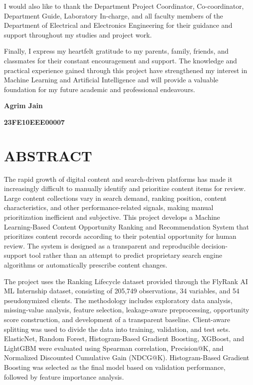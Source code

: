 \documentclass[12pt,a4paper]{report}
\begin{document}
I would also like to thank the Department Project Coordinator, Co-coordinator, Department Guide, Laboratory In-charge, and all faculty members of the Department of Electrical and Electronics Engineering for their guidance and support throughout my studies and project work.

Finally, I express my heartfelt gratitude to my parents, family, friends, and classmates for their constant encouragement and support. The knowledge and practical experience gained through this project have strengthened my interest in Machine Learning and Artificial Intelligence and will provide a valuable foundation for my future academic and professional endeavours.

\vspace{1cm}
\textbf{Agrim Jain}\par
\textbf{23FE10EEE00007}

\chapter*{ABSTRACT}
The rapid growth of digital content and search-driven platforms has made it increasingly difficult to manually identify and prioritize content items for review. Large content collections vary in search demand, ranking position, content characteristics, and other performance-related signals, making manual prioritization inefficient and subjective. This project develops a Machine Learning-Based Content Opportunity Ranking and Recommendation System that prioritizes content records according to their potential opportunity for human review. The system is designed as a transparent and reproducible decision-support tool rather than an attempt to predict proprietary search engine algorithms or automatically prescribe content changes.

The project uses the Ranking Lifecycle dataset provided through the FlyRank AI ML Internship dataset, consisting of 205,749 observations, 34 variables, and 54 pseudonymized clients. The methodology includes exploratory data analysis, missing-value analysis, feature selection, leakage-aware preprocessing, opportunity score construction, and development of a transparent baseline. Client-aware splitting was used to divide the data into training, validation, and test sets. ElasticNet, Random Forest, Histogram-Based Gradient Boosting, XGBoost, and LightGBM were evaluated using Spearman correlation, Precision@K, and Normalized Discounted Cumulative Gain (NDCG@K). Histogram-Based Gradient Boosting was selected as the final model based on validation performance, followed by feature importance analysis.
\end{document}
